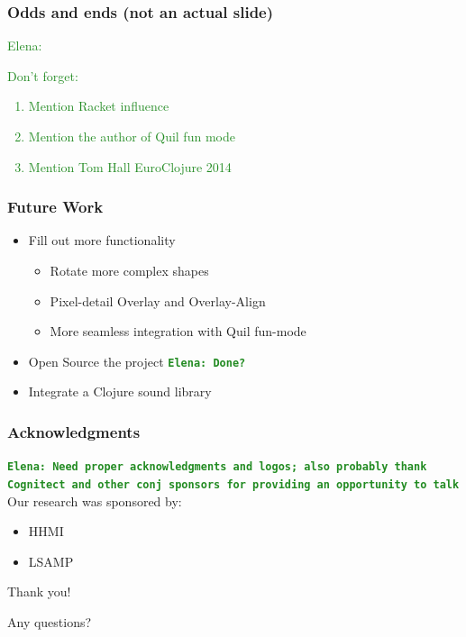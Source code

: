 \documentclass{beamer}
\newcommand{\comment}[1]{{\bf \tt  {#1}}}
\newcommand{\emcomment}[1]{\textcolor{ForestGreen}{\comment{Elena: {#1}}}}
\begin{document}
\begin{frame}
\frametitle{Odds and ends (not an actual slide)}
\emcomment{Don't forget:
\begin{enumerate}
\item Mention Racket influence  
\item Mention the author of Quil fun mode
\item Mention Tom Hall EuroClojure 2014
\end{enumerate}
}
\end{frame}

\begin{frame}
	\frametitle{Future Work}
	\begin{itemize}
		\item Fill out more functionality
		\begin{itemize}
			\item Rotate more complex shapes
			\item Pixel-detail Overlay and Overlay-Align
			\item More seamless integration with Quil fun-mode
		\end{itemize}
		\item Open Source the project \emcomment{Done?}
		\item Integrate a Clojure sound library
	\end{itemize}
\end{frame}

\begin{frame}
\frametitle{Acknowledgments}
\emcomment{Need proper acknowledgments and logos; also probably thank Cognitect and other conj sponsors for providing an opportunity to talk}
	Our research was sponsored by:
	\begin{itemize}
	\item HHMI
	\item LSAMP
	\end{itemize}
	{\centering
	\noindent
	Thank you! \par
	Any questions? \par
	}
\end{frame}
\end{document}
